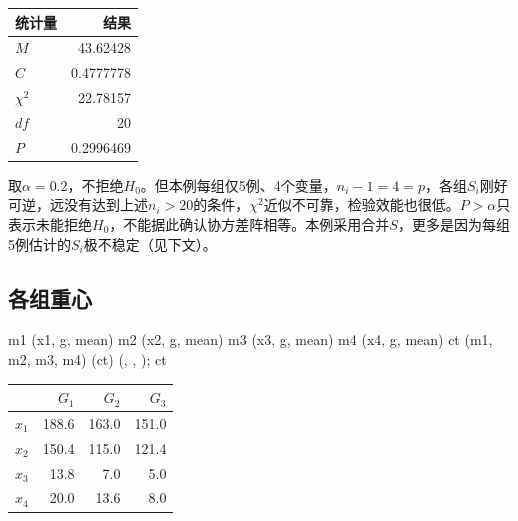 \begin{center}\begin{tabular}{lr}\toprule
{\bfseries 统计量}&{\bfseries 结果}\\\midrule
$M$&43.62428\\$C$&0.4777778\\$\chi^2$&22.78157\\$df$&20\\$P$&0.2996469\\\bottomrule
\end{tabular}\end{center}
取$\alpha=0.2$，不拒绝$H_0$。但本例每组仅5例、4个变量，$n_i-1=4=p$，各组$S_i$刚好可逆，远没有达到上述$n_i>20$的条件，$\chi^2$近似不可靠，检验效能也很低。$P>\alpha$只表示未能拒绝$H_0$，不能据此确认协方差阵相等。本例采用合并$S$，更多是因为每组5例估计的$S_i$极不稳定（见下文）。
\subsection{各组重心}
\begin{code}
m1 \ROperator{<-} (x1, g, mean)
m2 \ROperator{<-} (x2, g, mean)
m3 \ROperator{<-} (x3, g, mean)
m4 \ROperator{<-} (x4, g, mean)
ct \ROperator{<-} (m1, m2, m3, m4)
(ct) \ROperator{<-} (, , ); ct
\end{code}
\begin{center}\begin{tabular}{lrrr}\toprule
&{\bfseries $G_1$}&{\bfseries $G_2$}&{\bfseries $G_3$}\\\midrule
$x_1$&188.6&163.0&151.0\\$x_2$&150.4&115.0&121.4\\$x_3$&13.8&7.0&5.0\\$x_4$&20.0&13.6&8.0\\\bottomrule
\end{tabular}\end{center}
